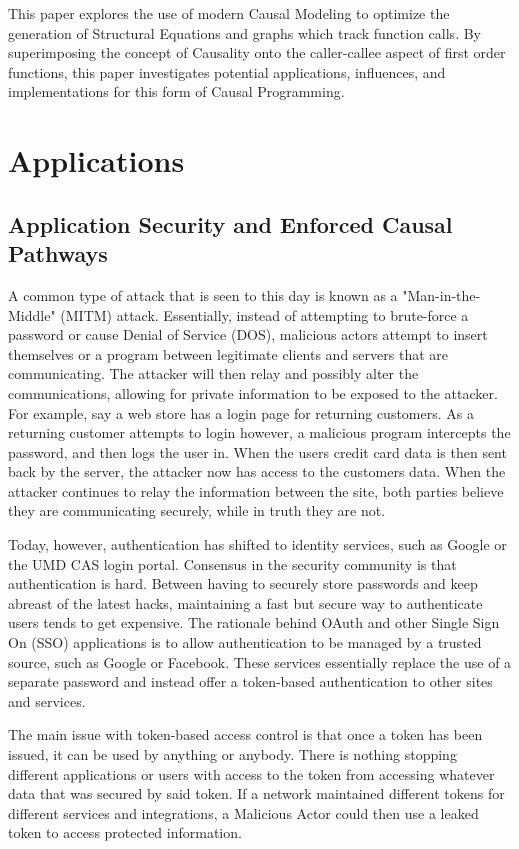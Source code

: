 \documentclass[runningheads]{llncs}
\begin{document}
This paper explores the use of modern Causal Modeling to optimize the generation of Structural Equations and graphs which track function calls. By superimposing the concept of Causality onto the caller-callee aspect of first order functions, this paper investigates potential applications, influences, and implementations for this form of Causal Programming.


\section{Applications}

\subsection{Application Security and Enforced Causal Pathways}

A common type of attack that is seen to this day is known as a "Man-in-the-Middle" (MITM) attack. Essentially, instead of attempting to brute-force a password or cause Denial of Service (DOS), malicious actors attempt to insert themselves or a program between legitimate clients and servers that are communicating. The attacker will then relay and possibly alter the communications, allowing for private information to be exposed to the attacker. For example, say a web store has a login page for returning customers. As a returning customer attempts to login however, a malicious program intercepts the password, and then logs the user in. When the users credit card data is then sent back by the server, the attacker now has access to the customers data. When the attacker continues to relay the information between the site, both parties believe they are communicating securely, while in truth they are not.

Today, however, authentication has shifted to identity services, such as Google or the UMD CAS login portal. Consensus in the security community is that authentication is hard. Between having to securely store passwords and keep abreast of the latest hacks, maintaining a fast but secure way to authenticate users tends to get expensive. The rationale behind OAuth and other Single Sign On (SSO) applications is to allow authentication to be managed by a trusted source, such as Google or Facebook. These services essentially replace the use of a separate password and instead offer a token-based authentication to other sites and services.

The main issue with token-based access control is that once a token has been issued, it can be used by anything or anybody. There is nothing stopping different applications or users with access to the token from accessing whatever data that was secured by said token. If a network maintained different tokens for different services and integrations, a Malicious Actor could then use a leaked token to access protected information.
\end{document}
